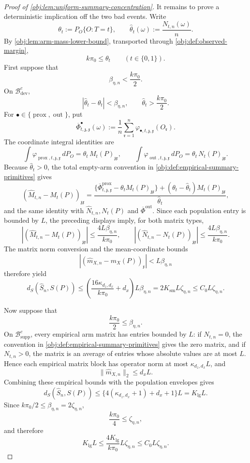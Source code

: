 \documentclass[11pt]{article}
\begin{document}
\begin{proof}[Proof of \cref{obj:lem:uniform-summary-concentration}]
It remains to prove a deterministic implication off the two bad events.  Write
\[
\theta_t:=P_O\{O:T=t\},
\qquad
\widehat\theta_t(\omega):=\frac{N_{t,n}(\omega)}{n}.
\]
By \cref{obj:lem:arm-mass-lower-bound}, transported through
\cref{obj:def:observed-margin},
\[
k\pi_0\le \theta_t
\qquad(t\in\{0,1\}).
\]
First suppose that
\[
\beta_{\eta,n}<\frac{k\pi_0}{2}.
\]
On \(\mathcal B_{\mathrm{dev}}^c\),
\[
|\widehat\theta_t-\theta_t|<\beta_{\eta,n},
\qquad
\widehat\theta_t>\frac{k\pi_0}{2}.
\]
For \(\bullet\in\{\operatorname{prox},\operatorname{out}\}\), put
\[
\overline\Phi^\bullet_{t,\mathfrak z,\mathfrak x}(\omega)
:=
\frac1n\sum_{\mathfrak r=1}^n
\varphi_{\bullet,t,\mathfrak z,\mathfrak x}(O_{\mathfrak r}).
\]
The coordinate integral identities are
\[
\int\varphi_{\operatorname{prox},t,\mathfrak z,\mathfrak x}\,dP_O
=
\theta_t\,M_t(P)_{\mathfrak z\mathfrak x},
\qquad
\int\varphi_{\operatorname{out},t,\mathfrak z,\mathfrak x}\,dP_O
=
\theta_t\,N_t(P)_{\mathfrak z\mathfrak x}.
\]
Because \(\widehat\theta_t>0\), the total empty-arm convention in
\cref{obj:def:empirical-summary-primitives} gives
\[
(\widehat M_{t,n}-M_t(P))_{\mathfrak z\mathfrak x}
=
\frac{
\{\overline\Phi^{\operatorname{prox}}_{t,\mathfrak z,\mathfrak x}
-\theta_tM_t(P)_{\mathfrak z\mathfrak x}\}
+
(\theta_t-\widehat\theta_t)M_t(P)_{\mathfrak z\mathfrak x}
}{\widehat\theta_t},
\]
and the same identity with \(\widehat N_{t,n},N_t(P)\) and
\(\overline\Phi^{\operatorname{out}}\).  Since each population entry is bounded
by \(L\), the preceding displays imply, for both matrix types,
\[
\left|
(\widehat M_{t,n}-M_t(P))_{\mathfrak z\mathfrak x}
\right|
\le
\frac{4L\beta_{\eta,n}}{k\pi_0},
\qquad
\left|
(\widehat N_{t,n}-N_t(P))_{\mathfrak z\mathfrak x}
\right|
\le
\frac{4L\beta_{\eta,n}}{k\pi_0}.
\]
The matrix norm conversion and the mean-coordinate bounds
\[
|(\widehat m_{X,n}-m_X(P))_{\mathfrak x}|<L\beta_{\eta,n}
\]
therefore yield
\[
d_S(\widehat S_n,S(P))
\le
\left(\frac{16\kappa_{d_z,d_x}}{k\pi_0}+d_x\right)L\beta_{\eta,n}
=
2K_{\mathrm{sm}}L\zeta_{\eta,n}
\le
C_0L\zeta_{\eta,n}.
\]  %

Now suppose that
\[
\frac{k\pi_0}{2}\le \beta_{\eta,n}.
\]
On \(\mathcal B_{\mathrm{supp}}^c\), every empirical arm matrix has entries
bounded by \(L\): if \(N_{t,n}=0\), the convention in
\cref{obj:def:empirical-summary-primitives} gives the zero matrix, and if
\(N_{t,n}>0\), the matrix is an average of entries whose absolute values are at
most \(L\).  Hence each empirical matrix block has operator norm at most
\(\kappa_{d_z,d_x}L\), and
\[
\|\widehat m_{X,n}\|_2\le d_xL .
\]
Combining these empirical bounds with the population envelopes gives
\[
d_S(\widehat S_n,S(P))
\le
\{4(\kappa_{d_z,d_x}+1)+d_x+1\}L
=
K_{\mathrm{lg}}L .
\]
Since \(k\pi_0/2\le\beta_{\eta,n}=2\zeta_{\eta,n}\),
\[
\frac{k\pi_0}{4}\le \zeta_{\eta,n},
\]
and therefore
\[
K_{\mathrm{lg}}L
\le
\frac{4K_{\mathrm{lg}}}{k\pi_0}L\zeta_{\eta,n}
\le
C_0L\zeta_{\eta,n}.
\]  %


\end{proof}
\end{document}

